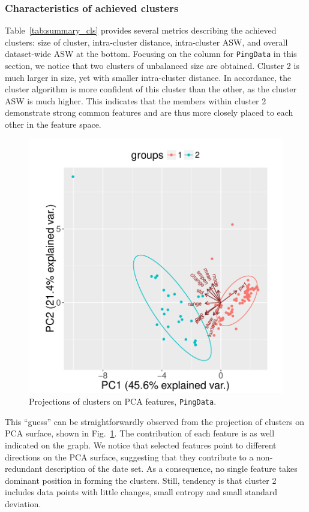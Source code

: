 \subsubsection{Characteristics of achieved clusters}
Table~\ref{tab:summary_cls} provides several metrics describing the achieved clusters: size of cluster, intra-cluster distance, intra-cluster \ac{ASW}, and overall dataset-wide \ac{ASW} at the bottom.
Focusing on the column for \texttt{PingData} in this section, we notice that two clusters of unbalanced size are obtained.
Cluster 2 is much larger in size, yet with smaller intra-cluster distance. 
In accordance, the cluster algorithm is more confident of this cluster than the other, as the cluster \ac{ASW} is much higher.
This indicates that the members within cluster 2 demonstrate strong common features and are thus more closely placed to each other in the feature space.

\begin{figure}[!htb]
\centering
\includegraphics[width=.68\textwidth]{gfx/chap3/ping_pca_ping.pdf}
\caption{Projections of clusters on \ac{PCA} features, \texttt{PingData}.}
\label{fig:ping_pca}
\end{figure}

This ``guess'' can be straightforwardly observed from the projection of clusters on \acf{PCA} surface, shown in Fig.~\ref{fig:ping_pca}.
The contribution of each feature is as well indicated on the graph.
We notice that selected features point to different directions on the \ac{PCA} surface, suggesting that they contribute to a non-redundant description of the date set.
As a consequence, no single feature takes dominant position in forming the clusters.
Still, tendency is that cluster 2 includes data points with little  changes, small entropy and small standard deviation. 

